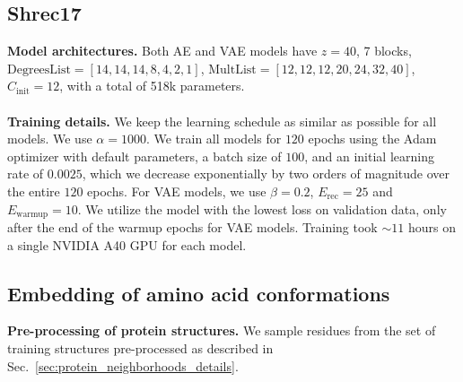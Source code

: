 \subsection{Shrec17}
\label{sec:shrec17_details}
\textbf{Model architectures.} Both AE and VAE models have $z = 40$, 7 blocks, $\text{DegreesList} =
[14, 14, 14, 8, 4, 2, 1]$, $\text{MultList} = [12, 12, 12, 20, 24, 32, 40]$, $C_\text{init} = 12$,
with a total of 518k parameters.\\
\\
\textbf{Training details.} We keep the learning schedule as similar as possible for all models. We
use $\alpha = 1000$. We train all models for $120$ epochs using the Adam optimizer with default
parameters, a batch size of $100$, and an initial learning rate of $0.0025$, which we decrease
exponentially by two orders of magnitude over the entire $120$ epochs. For VAE models, we use
$\beta = 0.2$, $E_\text{rec} = 25$ and $E_\text{warmup} = 10$. We utilize the model with the lowest
loss on validation data, only after the end of the warmup epochs for VAE models. Training took
$\sim 11$ hours on a single NVIDIA A40 GPU for each model.


\subsection{Embedding of amino acid conformations}
\label{sec:toy_aminoacids_details}

\noindent \textbf{Pre-processing of protein structures.} We sample residues from the set of
training structures pre-processed as described in Sec.~\ref{sec:protein_neighborhoods_details}.\\

